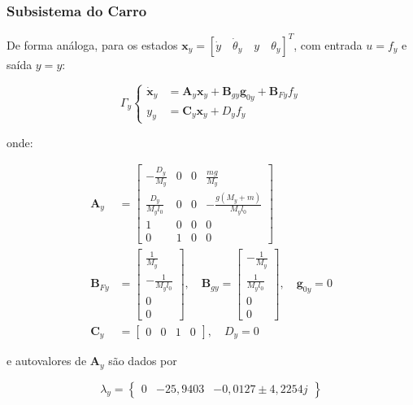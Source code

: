 \documentclass{ppgeesa}
\begin{document}
\subsubsection{Subsistema do Carro}

De forma análoga, para os estados $\mathbf{x}_y = [\dot{y}\quad\dot{\theta}_y\quad y\quad\theta_y]^T$, com entrada $u = f_y$ e saída $y = y$:

\begin{equation}
    \Gamma_y
    \begin{cases}
      \dot{\mathbf{x}}_y &= \mathbf{A}_y \mathbf{x}_y + \mathbf{B}_{gy}\mathbf{g}_{0y} + \mathbf{B}_{Fy} f_y \\
      y_y &= \mathbf{C}_y \mathbf{x}_y + D_y f_y
  \end{cases}
\end{equation}

\noindent onde:

\begin{align*}
    \mathbf{A}_y &= \begin{bmatrix} -\frac{D_y}{M_y} & 0 & 0 & \frac{mg}{M_y} \\[6pt] \frac{D_y}{M_y l_0} & 0 & 0 & -\frac{g(M_y+m)}{M_y l_0} \\[6pt] 1 & 0 & 0 & 0 \\ 0 & 1 & 0 & 0 \end{bmatrix} \\
    \mathbf{B}_{Fy} &= \begin{bmatrix} \frac{1}{M_y} \\[6pt] -\frac{1}{M_y l_0} \\[6pt] 0 \\ 0 \end{bmatrix}, \quad
    \mathbf{B}_{gy} = \begin{bmatrix} -\frac{1}{M_y} \\[6pt] \frac{1}{M_y l_0} \\[6pt] 0 \\ 0 \end{bmatrix}, \quad
    \mathbf{g}_{0y} = 0 \\
    \mathbf{C}_y &= \begin{bmatrix} 0 & 0 & 1 & 0 \end{bmatrix}, \quad
    D_y = 0
\end{align*}

\noindent e autovalores de $\mathbf{A}_y$ são dados por

\begin{equation}
    \lambda_{y} = \begin{Bmatrix}
      0 & -25{,}9403 & -0{,}0127 \pm 4{,}2254j
    \end{Bmatrix}
\end{equation}
\end{document}
